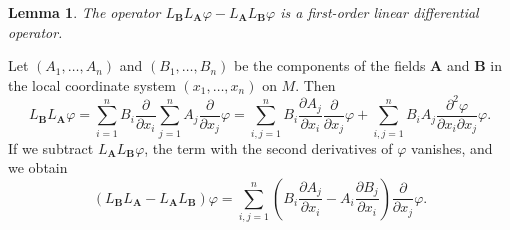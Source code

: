 \documentclass[leqno]{book}
\numberwithin{equation}{section}
\theoremstyle{plain}
\newtheorem{lem}[thm]{Lemma} %
\let\oldendproof\endproof
\renewenvironment{proof}[1][\proofname]{%
  \oldproof[\textsc{#1}]%
}{\oldendproof}
\theoremstyle{definition}
\theoremstyle{remark}
\theoremstyle{smallcap}
\numberwithin{prob}{section}
\begin{document}
\begin{lem}
  The operator
  $L_\mathbf{B} L_\mathbf{A} \varphi-L_\mathbf{A} L_\mathbf{B} \varphi$
  is a first-order linear differential operator.
\end{lem}

\begin{proof}
  Let $(A_1, \dots, A_n)$ and $(B_1, \dots, B_n)$
  be the components of the fields $\mathbf A$ and $\mathbf B$
  in the local coordinate system $(x_1, \dots, x_n)$ on $M$.
  Then
  $$
  L_\mathbf{B} L_\mathbf{A} \varphi
  =
  \sum_{i=1}^n B_i \frac{\partial}{\partial x_i}
  \sum_{j=1}^n A_j \frac{\partial}{\partial x_j} \varphi
  =
  \sum_{i,j=1}^n
    B_i \frac{\partial A_j}{\partial x_i}
    \frac{\partial}{\partial x_j} \varphi
  +
  \sum_{i,j=1}^n
    B_i A_j
    \frac{\partial^2 \varphi}{\partial x_i \partial x_j} \varphi.
  $$
  If we subtract $L_\mathbf{A} L_\mathbf{B} \varphi$,
  the term with the second derivatives of $\varphi$ vanishes,
  and we obtain
  $$
  (L_\mathbf{B} L_\mathbf{A} - L_\mathbf{A} L_\mathbf{B}) \varphi
  =
  \sum_{i,j=1}^n
    \left(
      B_i \frac{\partial A_j}{\partial x_i}
      -
      A_i \frac{\partial B_j}{\partial x_i}
    \right)
    \frac{\partial}{\partial x_j} \varphi.
  $$
\end{proof}
\end{document}
